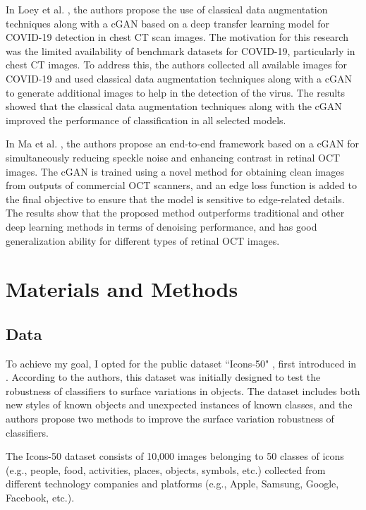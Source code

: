 \documentclass[conference]{IEEEtran}
\begin{document}
In Loey et al. \cite{Loey2020AImages}, the authors propose the use of classical data augmentation techniques along with a cGAN based on a deep transfer learning model for COVID-19 detection in chest CT scan images. The motivation for this research was the limited availability of benchmark datasets for COVID-19, particularly in chest CT images. To address this, the authors collected all available images for COVID-19 and used classical data augmentation techniques along with a cGAN to generate additional images to help in the detection of the virus. The results showed that the classical data augmentation techniques along with the cGAN improved the performance of classification in all selected models.

In Ma et al. \cite{Ma2018SpeckleCGAN}, the authors propose an end-to-end framework based on a cGAN for simultaneously reducing speckle noise and enhancing contrast in retinal OCT images. The cGAN is trained using a novel method for obtaining clean images from outputs of commercial OCT scanners, and an edge loss function is added to the final objective to ensure that the model is sensitive to edge-related details. The results show that the proposed method outperforms traditional and other deep learning methods in terms of denoising performance, and has good generalization ability for different types of retinal OCT images.

\section{Materials and Methods}

\subsection{Data}
To achieve my goal, I opted for the public dataset ``Icons-50" \cite{Icons50}, first introduced in \cite{Hendrycks2018}. According to the authors, this dataset was initially designed to test the robustness of classifiers to surface variations in objects. The dataset includes both new styles of known objects and unexpected instances of known classes, and the authors propose two methods to improve the surface variation robustness of classifiers.

The Icons-50 dataset consists of 10,000 images belonging to 50 classes of icons (e.g., people, food, activities, places, objects, symbols, etc.) collected from different technology companies and platforms (e.g., Apple, Samsung, Google, Facebook, etc.). 
\end{document}
